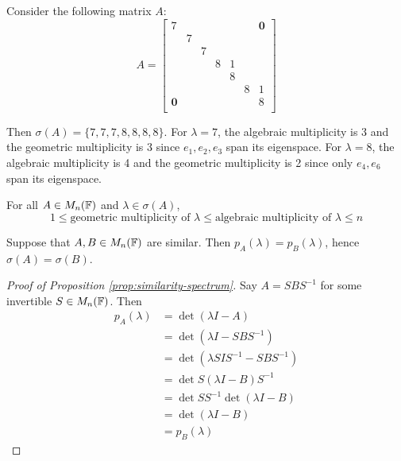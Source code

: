 \begin{example}
Consider the following matrix $A$:
$$
A = \begin{bmatrix}
7 &   &   &   &   &   & \textbf{0}\\
  & 7 &   &   &   &   &  \\
  &   & 7 &   &   &   &  \\
  &   &   & 8 & 1 &   &  \\
  &   &   &   & 8 &   &  \\
  &   &   &   &   & 8 & 1\\
\textbf{0} &   &   &   &   &   & 8\\
\end{bmatrix}
$$

Then $\sigma(A) = \{7,7,7,8,8,8,8\}$. For $\lambda = 7$, the algebraic multiplicity is 3 and the geometric multiplicity is 3 since $e_1, e_2, e_3$ span its eigenspace. For $\lambda = 8$, the algebraic multiplicity is 4 and the geometric multiplicity is 2 since only $e_4, e_6$ span its eigenspace.
\end{example}

\begin{remark*}
For all $A \in M_n(\mathbb F)$ and $\lambda \in \sigma(A)$, 
$$
1 \leq \text{geometric multiplicity of } \lambda \leq \text{algebraic multiplicity of } \lambda \leq n
$$
\end{remark*}

\begin{proposition}
\label{prop:similarity-spectrum}
Suppose that $A, B \in M_n(\mathbb F)$ are similar. Then $p_A(\lambda) = p_B(\lambda)$, hence $\sigma(A) = \sigma(B)$.
\end{proposition}

\begin{proof}[Proof of Proposition \ref{prop:similarity-spectrum}]
Say $A = SBS^{-1}$ for some invertible $S \in M_n(\mathbb F)$. Then
\begin{align*}
p_A(\lambda) &= \det(\lambda I - A) \\
             &= \det(\lambda I - SBS^{-1}) \\
             &= \det(\lambda SIS^{-1} - SBS^{-1}) \\
             &= \det S(\lambda I - B)S^{-1} \\
             &= \det SS^{-1} \det(\lambda I - B) \\
             &= \det(\lambda I - B) \\
             &= p_B(\lambda)
\end{align*}
\end{proof}

